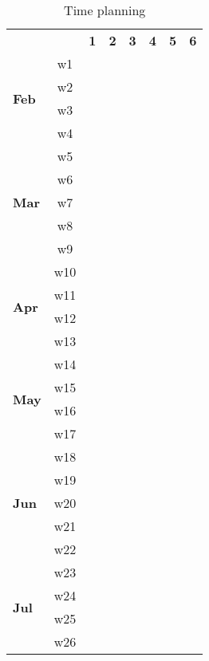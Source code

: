 \begin{table}[h]
  \begin{center}
    \addtolength{\tabcolsep}{4pt} %
    \renewcommand{\arraystretch}{0.8} %
      \begin{tabular}{ l c c c c c c c }
        && \textbf{1} & \textbf{2} & \textbf{3} & \textbf{4} & \textbf{5} & \textbf{6} \\ 
        \multirow{4}{*}{\textbf{Feb}} & w1 & \cellcolor[rgb]{0.94,0.96,0.98} \\ & w2 & \cellcolor[rgb]{0.94,0.96,0.98} \\ & w3 & \cellcolor[rgb]{0.94,0.96,0.98} \\ & w4 & \cellcolor[rgb]{0.94,0.96,0.98} \\ 
        \multirow{5}{*}{\textbf{Mar}} & w5 && \cellcolor[rgb]{0.86,0.90,0.96} \\ & w6 && \cellcolor[rgb]{0.86,0.90,0.96} \\ & w7 && \cellcolor[rgb]{0.86,0.90,0.96} \\ & w8 && \cellcolor[rgb]{0.86,0.90,0.96} \\ & w9 && \cellcolor[rgb]{0.86,0.90,0.96} \\ 
        \multirow{4}{*}{\textbf{Apr}} & w10 &&& \cellcolor[rgb]{0.78,0.84,0.94} \\ & w11 &&& \cellcolor[rgb]{0.78,0.84,0.94} \\ & w12 &&& \cellcolor[rgb]{0.78,0.84,0.94} \\ & w13 &&& \cellcolor[rgb]{0.78,0.84,0.94} \\ 
        \multirow{4}{*}{\textbf{May}} & w14 &&&& \cellcolor[rgb]{0.71,0.78,0.92} \\ & w15 &&&& \cellcolor[rgb]{0.71,0.78,0.92} \\ & w16 &&&& \cellcolor[rgb]{0.71,0.78,0.92} \\ & w17 &&&& \cellcolor[rgb]{0.71,0.78,0.92} \\ 
        \multirow{5}{*}{\textbf{Jun}} & w18 &&&&& \cellcolor[rgb]{0.63,0.73,0.89} \\ & w19 &&&&& \cellcolor[rgb]{0.63,0.73,0.89} \\ & w20 &&&&& \cellcolor[rgb]{0.63,0.73,0.89} \\ & w21 &&&&& \cellcolor[rgb]{0.63,0.73,0.89} \\ & w22 &&&&& \cellcolor[rgb]{0.63,0.73,0.89} \\ 
        \multirow{4}{*}{\textbf{Jul}} & w23 &&&&&& \cellcolor[rgb]{0.55,0.67,0.87} \\ & w24 &&&&&& \cellcolor[rgb]{0.55,0.67,0.87} \\ & w25 &&&&&& \cellcolor[rgb]{0.55,0.67,0.87} \\ & w26 &&&&&& \cellcolor[rgb]{0.55,0.67,0.87} \\ 
      \end{tabular}
    \caption{Time planning}
    \label{tab:planning}
  \end{center}
\end{table}